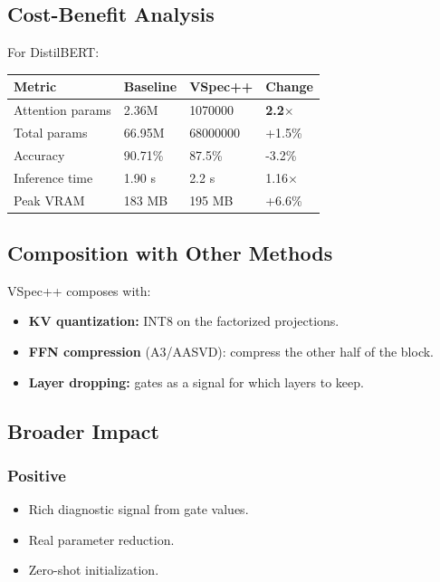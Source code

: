 \subsection{Cost-Benefit Analysis}

For DistilBERT:

\begin{table}[H]
\centering
\small
\begin{tabular}{llll}
\toprule
\textbf{Metric} & \textbf{Baseline} & \textbf{VSpec++} & \textbf{Change} \\
\midrule
Attention params & 2.36M & 1070000 & \textbf{2.2$\times$} \\
Total params & 66.95M & 68000000 & +1.5\% \\
Accuracy & 90.71\% & 87.5\% & -3.2\% \\
Inference time & 1.90 s & 2.2 s & 1.16$\times$ \\
Peak VRAM & 183 MB & 195 MB & +6.6\% \\
\bottomrule
\end{tabular}
\end{table}

\subsection{Composition with Other Methods}

VSpec++ composes with:

\begin{itemize}
\item \textbf{KV quantization:} INT8 on the factorized projections.
\item \textbf{FFN compression} (A3/AASVD): compress the other half of the block.
\item \textbf{Layer dropping:} gates as a signal for which layers to keep.

\end{itemize}
\subsection{Broader Impact}

\subsubsection{Positive}
\begin{itemize}
\item Rich diagnostic signal from gate values.
\item Real parameter reduction.
\item Zero-shot initialization.

\end{itemize}
